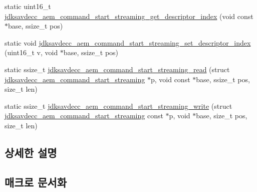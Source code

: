 \begin{DoxyCompactItemize}
\item 
static uint16\+\_\+t \hyperlink{group__command__start__streaming_ga5ddbca5321e47a37744df5fa85958916}{jdksavdecc\+\_\+aem\+\_\+command\+\_\+start\+\_\+streaming\+\_\+get\+\_\+descriptor\+\_\+index} (void const $\ast$base, ssize\+\_\+t pos)
\item 
static void \hyperlink{group__command__start__streaming_gaf62cc59438195224eb9339af8791735c}{jdksavdecc\+\_\+aem\+\_\+command\+\_\+start\+\_\+streaming\+\_\+set\+\_\+descriptor\+\_\+index} (uint16\+\_\+t v, void $\ast$base, ssize\+\_\+t pos)
\item 
static ssize\+\_\+t \hyperlink{group__command__start__streaming_ga45ff09f083a4fdebfbb75857d31c0051}{jdksavdecc\+\_\+aem\+\_\+command\+\_\+start\+\_\+streaming\+\_\+read} (struct \hyperlink{structjdksavdecc__aem__command__start__streaming}{jdksavdecc\+\_\+aem\+\_\+command\+\_\+start\+\_\+streaming} $\ast$p, void const $\ast$base, ssize\+\_\+t pos, size\+\_\+t len)
\item 
static ssize\+\_\+t \hyperlink{group__command__start__streaming_ga7bd7788fdc598aee7b74a487c1a8e03a}{jdksavdecc\+\_\+aem\+\_\+command\+\_\+start\+\_\+streaming\+\_\+write} (struct \hyperlink{structjdksavdecc__aem__command__start__streaming}{jdksavdecc\+\_\+aem\+\_\+command\+\_\+start\+\_\+streaming} const $\ast$p, void $\ast$base, size\+\_\+t pos, size\+\_\+t len)
\end{DoxyCompactItemize}


\subsection{상세한 설명}


\subsection{매크로 문서화}
